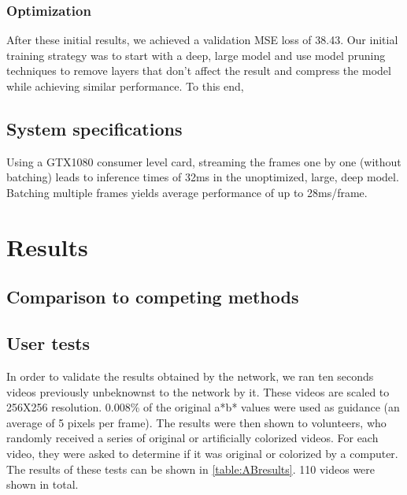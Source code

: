 \documentclass[12pt,openright,twoside,a4paper,english]{abntex2}
\begin{document}
\begin{otherlanguage}{english}

\subsection{Optimization}
After these initial results, we achieved a validation MSE loss of 38.43.
Our initial training strategy was to start with a deep, large model and use model pruning techniques to remove layers that don't affect the result and compress the model while achieving similar performance. To this end,

\section{System specifications}
Using a GTX1080 consumer level card, streaming the frames one by one (without batching) leads to inference times of 32ms in the unoptimized, large, deep model. Batching multiple frames yields average performance of up to 28ms/frame.



\chapter{Results}
\section{Comparison to competing methods}


\section{User tests}
In order to validate the results obtained by the network, we ran ten seconds videos previously unbeknownst to the network by it. These videos are scaled to 256X256 resolution. 0.008\% of the original a*b* values were used as guidance (an average of 5 pixels per frame). The results were then shown to volunteers, who randomly received a series of original or artificially colorized videos. For each video, they were asked to determine if it was original or colorized by a computer. The results of these tests can be shown in \ref{table:ABresults}. 110 videos were shown in total.


\end{otherlanguage}
\end{document}
